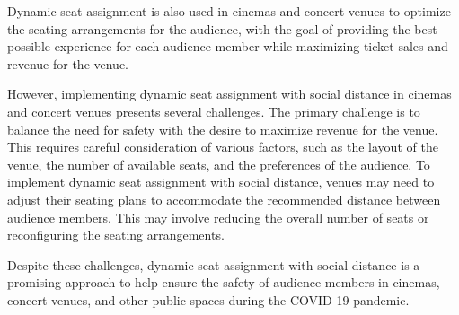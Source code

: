 Dynamic seat assignment is also used in cinemas and concert venues to optimize the seating arrangements for the audience, with the goal of providing the best possible experience for each audience member while maximizing ticket sales and revenue for the venue.

However, implementing dynamic seat assignment with social distance in cinemas and concert venues presents several challenges. The primary challenge is to balance the need for safety with the desire to maximize revenue for the venue. This requires careful consideration of various factors, such as the layout of the venue, the number of available seats, and the preferences of the audience. To implement dynamic seat assignment with social distance, venues may need to adjust their seating plans to accommodate the recommended distance between audience members. This may involve reducing the overall number of seats or reconfiguring the seating arrangements.


Despite these challenges, dynamic seat assignment with social distance is a promising approach to help ensure the safety of audience members in cinemas, concert venues, and other public spaces during the COVID-19 pandemic.







